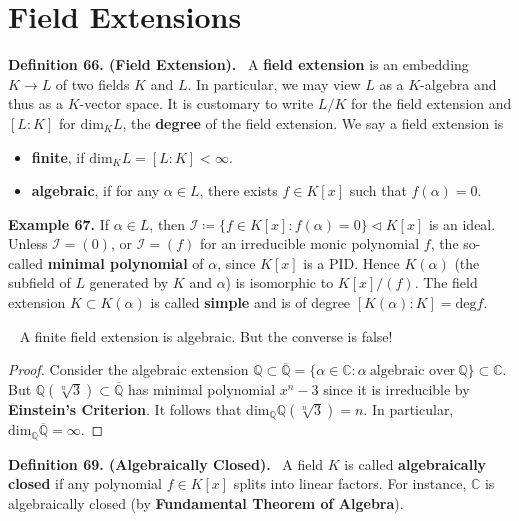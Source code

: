 \documentclass[12pt,a4paper,footinclude=true,headinclude=true]{scrbook} %
\newenvironment{proposition}[2][]
{\renewcommand\theinnercustomprop{#2}\innercustomprop[#1] 
\begin{mdframed}[backgroundcolor=gray!20]\ }
{\end{mdframed}\endinnercustomprop}
\newenvironment{definition}[2][Definition]
    { \begin{mdframed}[backgroundcolor=gray!20] \textbf{#1 #2.}\ }
    {  \end{mdframed}}
\newenvironment{example}[2][Example]
    { \begin{mdframed}[backgroundcolor=gray!20] \textbf{#1 #2.} }
    {  \end{mdframed}}
\begin{document}
\section{Field Extensions}
\begin{definition}{66. (Field Extension)}
    A \textbf{field extension} is an embedding $K\xrightarrow{} L$ of two fields $K$ and $L$. In particular, we may view $L$ as a $K$-algebra and thus as a $K$-vector space. It is customary to write $L/K$ for the field extension and $[L:K]$ for $\mathrm{dim}_KL$, the \textbf{degree} of the field extension. We say a field extension is 
    \begin{itemize}
        \item[(i)] \textbf{finite}, if $\mathrm{dim}_KL=[L:K]<\infty$.
        \item[(ii)] \textbf{algebraic}, if for any $\alpha\in L$, there exists $f\in K[x]$ such that $f(\alpha)=0$.
    \end{itemize}
\end{definition}

\begin{example}{67}
    If $\alpha\in L$, then $\mathcal{I}\coloneqq\{f\in K[x]:f(\alpha)=0\}\triangleleft K[x]$ is an ideal. Unless $\mathcal{I}=(0)$, or $\mathcal{I}=(f)$ for an irreducible monic polynomial $f$, the so-called \textbf{minimal polynomial} of $\alpha$, since $K[x]$ is a PID. Hence $K(\alpha)$ (the subfield of $L$ generated by $K$ and $\alpha$) is isomorphic to $K[x]/(f)$. The field extension $K\subset K(\alpha)$ is called \textbf{simple} and is of degree $[K(\alpha):K]=\mathrm{deg}f$.
\end{example}

\begin{proposition}{68}
    A finite field extension is algebraic. But the converse is false!
\end{proposition}
\begin{proof}
    Consider the algebraic extension $\mathbb{Q}\subset\overline{\mathbb{Q}}= \{\alpha\in\mathbb{C}:\alpha\ \text{algebraic over}\ \mathbb{Q}\}\subset \mathbb{C}$.\\ But $\mathbb{Q}(\sqrt[n]{3})\subset\overline{\mathbb{Q}}$ has minimal polynomial $x^n-3$ since it is irreducible by \textbf{Einstein's Criterion}. It follows that $\mathrm{dim}_{\mathbb{Q}}
    \mathbb{Q}(\sqrt[n]{3})=n$. In particular, $\mathrm{dim}_{\mathbb{Q}} \overline{\mathbb{Q}}=\infty$.
\end{proof}

\begin{definition}{69. (Algebraically Closed)}
    A field $K$ is called \textbf{algebraically closed} if any polynomial $f\in K[x]$ splits into linear factors. For instance, $\mathbb{C}$ is algebraically closed (by \textbf{Fundamental Theorem of Algebra}).
\end{definition}
\end{document}
